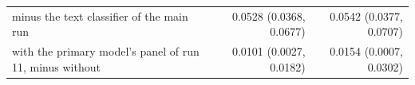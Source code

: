 \begin{tabular}{p{6.6cm}rr}
\quad minus the text classifier of the main run & 0.0528 (0.0368, 0.0677) & 0.0542 (0.0377, 0.0707) \\
\quad with the primary model's panel of run 11, minus without & 0.0101 (0.0027, 0.0182) & 0.0154 (0.0007, 0.0302) \\

\end{tabular}
